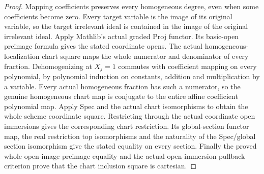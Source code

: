 \begin{proof}
Mapping coefficients preserves every homogeneous degree, even when some
coefficients become zero. Every target variable is the image of its original
variable, so the target irrelevant ideal is contained in the image of the
original irrelevant ideal. Apply Mathlib's actual graded Proj functor.
Its basic-open preimage formula gives the stated coordinate opens.
The actual homogeneous-localization chart square maps the whole numerator
and denominator of every fraction. Dehomogenizing at $X_j=1$ commutes
with coefficient mapping on every polynomial, by polynomial induction on
constants, addition and multiplication by a variable. Every actual
homogeneous fraction has such a numerator, so the genuine homogeneous
chart map is conjugate to the entire affine coefficient polynomial map.
Apply Spec and the actual chart isomorphisms to obtain the whole scheme
coordinate square. Restricting through the actual coordinate open immersions
gives the corresponding chart restriction. Its global-section functor map,
the real restriction top isomorphisms and the naturality of the Spec/global
section isomorphism give the stated equality on every section. Finally the
proved whole open-image preimage equality and the actual open-immersion
pullback criterion prove that the chart inclusion square is cartesian.
\end{proof}

